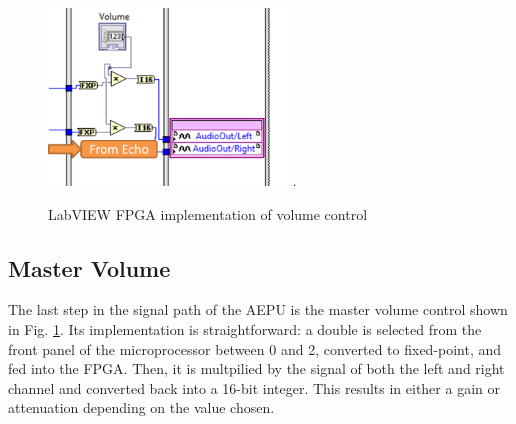 \begin{figure}[!t]
\centering
\includegraphics[width=2.5in]{volume.png}
\DeclareGraphicsExtensions.
\caption{LabVIEW FPGA implementation of volume control}
\label{fig_volume}
\end{figure} 

\subsection{Master Volume}

The last step in the signal path of the AEPU is the master volume control shown in Fig. \ref{fig_volume}.
Its implementation is straightforward: a double is selected from the front panel of the microprocessor between 0 and 2, converted to fixed-point, and fed into the FPGA.
Then, it is multpilied by the signal of both the left and right channel and converted back into a 16-bit integer.
This results in either a gain or attenuation depending on the value chosen.

%
%


